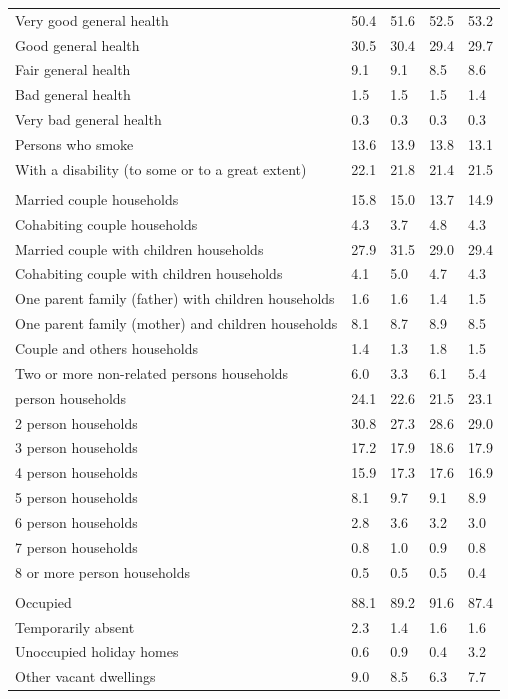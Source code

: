 \documentclass{article}
\begin{document}
\begin{table}[h]
\begin{tabular}{KTTTT}
    \hline
Very good general health & 50.4& 51.6&52.5& 53.2\\
Good general health & 30.5& 30.4& 29.4& 29.7\\
Fair general health & 9.1& 9.1&8.5& 8.6\\
Bad general health & 1.5& 1.5&1.5& 1.4\\
Very bad general health & 0.3& 0.3&0.3& 0.3\\
    \hline
Persons who smoke & 13.6& 13.9&13.8& 13.1\\
    \hline
With a disability (to some or to a great extent) & 22.1& 21.8&21.4& 21.5\\
\hline
    \\ 
    \hline
Married couple households & 15.8& 15.0& 13.7& 14.9\\
Cohabiting couple households & 4.3& 3.7& 4.8& 4.3\\
Married couple with children households & 27.9& 31.5& 29.0& 29.4\\
Cohabiting couple with children households & 4.1& 5.0& 4.7& 4.3\\
One parent family (father) with  children households & 1.6& 1.6& 1.4& 1.5\\
One parent family (mother) and children households & 8.1& 8.7& 8.9& 8.5\\
Couple and others households  & 1.4& 1.3& 1.8& 1.5\\
Two or more non-related persons households & 6.0& 3.3& 6.1& 5.4\\
     person households & 24.1& 22.6& 21.5& 23.1\\
2 person households & 30.8& 27.3& 28.6& 29.0\\
3 person households & 17.2& 17.9& 18.6& 17.9\\
4 person households & 15.9& 17.3& 17.6& 16.9\\
5 person households & 8.1& 9.7& 9.1& 8.9\\
6 person households & 2.8& 3.6& 3.2& 3.0\\
7 person households & 0.8& 1.0& 0.9& 0.8\\
8 or more person households & 0.5& 0.5& 0.5& 0.4\\
\hline
    \\ 
    \hline
Occupied & 88.1& 89.2& 91.6& 87.4\\
Temporarily absent & 2.3& 1.4& 1.6& 1.6\\
Unoccupied holiday homes & 0.6& 0.9& 0.4& 3.2\\
Other vacant dwellings & 9.0& 8.5& 6.3& 7.7\\
\hline
\end{tabular}
\end{table}
\end{document}
